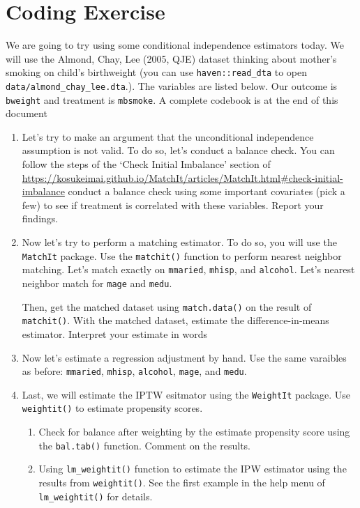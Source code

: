 \documentclass[12pt]{article}
\begin{document}
\section*{Coding Exercise}

We are going to try using some conditional independence estimators today. We will use the Almond, Chay, Lee (2005, QJE) dataset thinking about mother's smoking on child's birthweight (you can use \texttt{haven::read\_dta} to open \texttt{data/almond\_chay\_lee.dta}.). The variables are listed below. Our outcome is \texttt{bweight} and treatment is \texttt{mbsmoke}. A complete codebook is at the end of this document





\begin{enumerate}
  \item Let's try to make an argument that the unconditional independence assumption is not valid. To do so, let's conduct a balance check. You can follow the steps of the `Check Initial Imbalance' section of \url{https://kosukeimai.github.io/MatchIt/articles/MatchIt.html#check-initial-imbalance} conduct a balance check using some important covariates (pick a few) to see if treatment is correlated with these variables. Report your findings.
  
  \item Now let's try to perform a matching estimator. To do so, you will use the \texttt{MatchIt} package. Use the \texttt{matchit()} function to perform nearest neighbor matching. Let's match exactly on \texttt{mmaried}, \texttt{mhisp}, and \texttt{alcohol}. Let's nearest neighbor match for \texttt{mage} and \texttt{medu}. 
  
  Then, get the matched dataset using \texttt{match.data()} on the result of \texttt{matchit()}. With the matched dataset, estimate the difference-in-means estimator. Interpret your estimate in words


  \item Now let's estimate a regression adjustment by hand. Use the same varaibles as before: \texttt{mmaried}, \texttt{mhisp}, \texttt{alcohol}, \texttt{mage}, and \texttt{medu}.
  
  
  \item Last, we will estimate the IPTW esitmator using the \texttt{WeightIt} package. Use \texttt{weightit()} to estimate propensity scores.
  
  \begin{enumerate}
    \item Check for balance after weighting by the estimate propensity score using the \texttt{bal.tab()} function. Comment on the results.
    
    \item Using \texttt{lm\_weightit()} function to estimate the IPW estimator using the results from \texttt{weightit()}. See the first example in the help menu of \texttt{lm\_weightit()} for details.
  \end{enumerate}
\end{enumerate}
\end{document}
